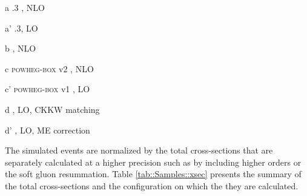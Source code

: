 \begin{table}[h]
\begin{center}
\begin{threeparttable}
\begin{tablenotes}\footnotesize
\item[a] .3 \cite{Alwall:2014hca}, NLO
\item[a'] .3, LO
\item[b] \sherpatwo \cite{Gleisberg:2008ta}, NLO
\item[c] \textsc{powheg-box} v2 \cite{Alioli:2010xd}, NLO
\item[c'] \textsc{powheg-box} v1 \cite{Alioli:2010xd}, LO
\item[d] \pythiaeight  \cite{Sjostrand:2007gs}, LO, CKKW matching
\item[d'] \pythiasix \cite{Sjostrand:2006za}, LO, ME correction
\end{tablenotes}
\end{threeparttable}
\end{center}
\end{table}


%
%

The simulated events are normalized by the total cross-sections that are separately calculated at a higher precision such as by including higher orders or the soft gluon resummation. 
Table \ref{tab::Samples::xsec} presents the summary of the total cross-sections and the configuration on which the they are calculated.


